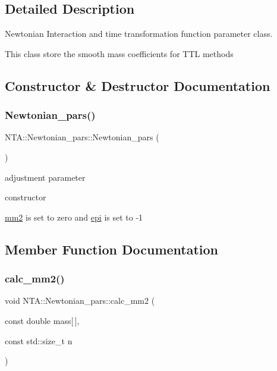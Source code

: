 \subsection{Detailed Description}
Newtonian Interaction and time transformation function parameter class. 

This class store the smooth mass coefficients for T\+TL methods 

\subsection{Constructor \& Destructor Documentation}
\hypertarget{classNTA_1_1Newtonian__pars_a350f6c6c5eaec1520604955ee32cd94b}{}\label{classNTA_1_1Newtonian__pars_a350f6c6c5eaec1520604955ee32cd94b} 
\subsubsection{\texorpdfstring{Newtonian\+\_\+pars()}{Newtonian\_pars()}}
{\footnotesize\ttfamily N\+T\+A\+::\+Newtonian\+\_\+pars\+::\+Newtonian\+\_\+pars (\begin{DoxyParamCaption}{ }\end{DoxyParamCaption})\hspace{0.3cm}{\ttfamily [inline]}}



adjustment parameter 

constructor

\hyperlink{classNTA_1_1Newtonian__pars_a2dbcde3115bdf43e8fcec4626e7ee5bb}{mm2} is set to zero and \hyperlink{classNTA_1_1Newtonian__pars_a4c4f79cd0d1600f8f038cdec15981268}{epi} is set to -\/1 

\subsection{Member Function Documentation}
\hypertarget{classNTA_1_1Newtonian__pars_ae447dcfbd1da0436db3684be1e19734d}{}\label{classNTA_1_1Newtonian__pars_ae447dcfbd1da0436db3684be1e19734d} 
\subsubsection{\texorpdfstring{calc\+\_\+mm2()}{calc\_mm2()}}
{\footnotesize\ttfamily void N\+T\+A\+::\+Newtonian\+\_\+pars\+::calc\+\_\+mm2 (\begin{DoxyParamCaption}\item[{const double}]{mass\mbox{[}$\,$\mbox{]},  }\item[{const std\+::size\+\_\+t}]{n }\end{DoxyParamCaption})\hspace{0.3cm}{\ttfamily [inline]}}



